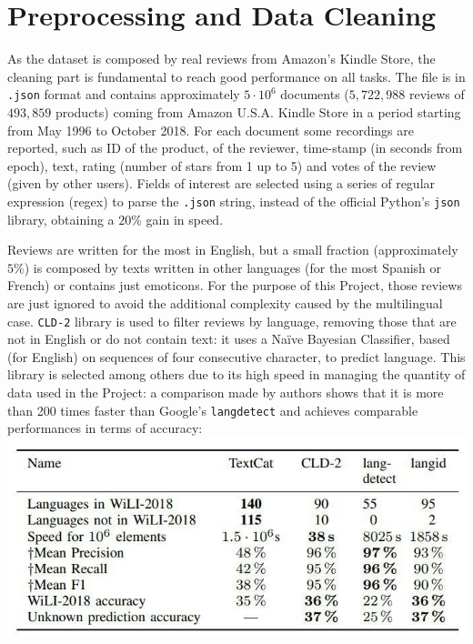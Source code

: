 \documentclass[fleqn,10pt]{SelfArx}
\begin{document}
\section{Preprocessing and Data Cleaning}
As the dataset is composed by real reviews from Amazon's Kindle Store, the cleaning part is fundamental to reach good performance on all tasks.
The file is in \verb|.json| format and contains approximately $5 \cdot 10^6$ documents ($5,722,988$ reviews of $493,859$ products) coming from Amazon U.S.A. Kindle Store in a period starting from May 1996 to October 2018.
For each document some recordings are reported, such as ID of the product, of the reviewer, time-stamp (in seconds from epoch), text, rating (number of stars from 1 up to 5) and votes of the review (given by other users).
Fields of interest are selected using a series of regular expression (regex) to parse the \verb|.json| string, instead of the official Python's \verb|json| library, obtaining a $20\%$ gain in speed. \newline

Reviews are written for the most in English, but a small fraction (approximately $5\%$) is composed by texts written in other languages (for the most Spanish or French) or contains just emoticons.
For the purpose of this Project, those reviews are just ignored to avoid the additional complexity caused by the multilingual case.
\verb|CLD-2|\cite{cld2} library is used to filter reviews by language, removing those that are not in English or do not contain text: it uses a Naïve Bayesian Classifier, based (for English) on sequences of four consecutive character, to predict language.
This library is selected among others due to its high speed in managing the quantity of data used in the Project: a comparison made by authors shows that it is more than 200 times faster than Google's \verb|langdetect| and achieves comparable performances in terms of accuracy\cite[6]{cld2}: \newline
\includegraphics[width=\linewidth]{languages}
\end{document}
